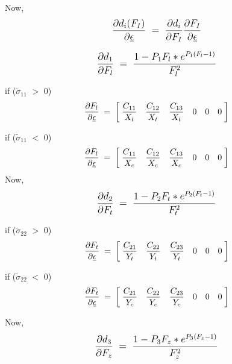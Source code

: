 \documentclass[12pt,a4paper,twoside,openright]{report}
\begin{document}
Now,
$$
\mathlarger{\frac{\partial d_{i}(F_{I})}{\partial \underline{\epsilon}} \; = \; \frac{\partial d_{i}}{\partial F_{I}} \frac{\partial F_{I}}{\partial \underline{\epsilon}}}
$$

$$
\mathlarger{\frac{\partial d_{1}}{\partial F_{l}} \; = \; \frac{1 - P_{1}F_{l}*e^{P_{1}(F_{l} - 1)}}{F_{l}^{2}}}
$$

if ($\tilde{\sigma}_{11}$ $>$ 0)
$$
\frac{\partial F_{l}}{\partial \underline{\epsilon}} \; = \; 
\begin{bmatrix}
\;\mathlarger{\frac{C_{11}}{X_{t}} }  & \mathlarger{\frac{C_{12}}{X_{t}} } & \mathlarger{\frac{C_{13}}{X_{t}}}  & \mathlarger{0} & \mathlarger{0}  & \mathlarger{0} \; \\
 \end{bmatrix}
$$

if ($\tilde{\sigma}_{11}$ $<$ 0)
$$
\frac{\partial F_{l}}{\partial \underline{\epsilon}} \; = \; 
\begin{bmatrix}
\;\mathlarger{\frac{C_{11}}{X_{c}} }  & \mathlarger{\frac{C_{12}}{X_{c}} } & \mathlarger{\frac{C_{13}}{X_{c}}}  & \mathlarger{0} & \mathlarger{0}  & \mathlarger{0} \; \\
 \end{bmatrix}
$$
\vspace*{1cm}
Now,
$$
\mathlarger{\frac{\partial d_{2}}{\partial F_{t}} \; = \; \frac{1 - P_{2}F_{t}*e^{P_{2}(F_{t} - 1)}}{F_{t}^{2}}}
$$

if ($\tilde{\sigma}_{22}$ $>$ 0)
$$
\frac{\partial F_{t}}{\partial \underline{\epsilon}} \; = \; 
\begin{bmatrix}
\;\mathlarger{\frac{C_{21}}{Y_{t}} }  & \mathlarger{\frac{C_{22}}{Y_{t}} } & \mathlarger{\frac{C_{23}}{Y_{t}}}  & \mathlarger{0} & \mathlarger{0}  & \mathlarger{0} \; \\
 \end{bmatrix}
$$

if ($\tilde{\sigma}_{22}$ $<$ 0)
$$
\frac{\partial F_{t}}{\partial \underline{\epsilon}} \; = \; 
\begin{bmatrix}
\;\mathlarger{\frac{C_{21}}{Y_{c}} }  & \mathlarger{\frac{C_{22}}{Y_{c}} } & \mathlarger{\frac{C_{23}}{Y_{c}}}  & \mathlarger{0} & \mathlarger{0}  & \mathlarger{0} \; \\
 \end{bmatrix}
$$

\vspace*{1cm}
Now,
$$
\mathlarger{\frac{\partial d_{3}}{\partial F_{z}} \; = \; \frac{1 - P_{3}F_{z}*e^{P_{3}(F_{z} - 1)}}{F_{z}^{2}}}
$$
\end{document}
